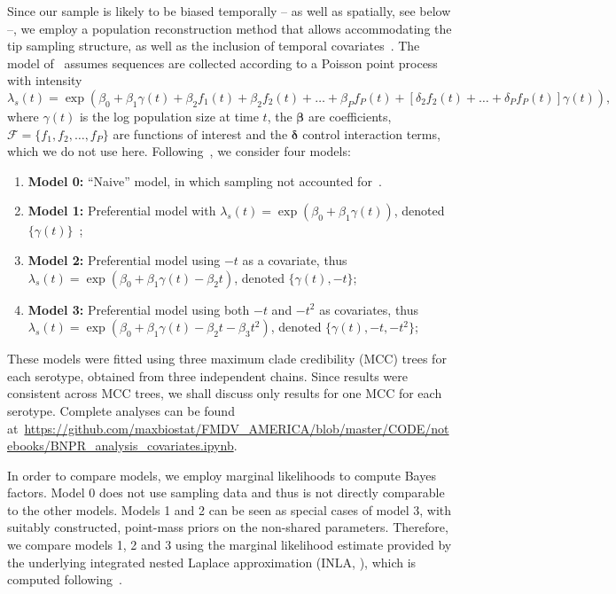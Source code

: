 \documentclass[a4paper,10pt]{article}
\begin{document}
Since our sample is likely to be biased temporally -- as well as spatially, see below --, we employ a population reconstruction method that allows accommodating the tip sampling structure, as well as the inclusion of temporal covariates~\citep{M-Karcher2019}.
The model of~\cite{M-Karcher2019} assumes sequences are collected according to a Poisson point process with intensity
\begin{equation}
 \label{eq:skytrack}
 \lambda_s(t) = \exp\left( \beta_0 + \beta_1\gamma(t) + \beta_2 f_1(t)  + \beta_2 f_2(t) + \ldots + \beta_P f_P(t) + \left[\delta_2 f_2(t) + \ldots + \delta_P f_P(t) \right]\gamma(t) \right),
\end{equation}
where $\gamma(t)$ is the log population size at time $t$, the $\boldsymbol\beta$ are coefficients, $\mathcal{F} = \{f_1, f_2, \ldots, f_P\}$ are functions of interest and the $\boldsymbol\delta$ control interaction terms, which we do not use here.
Following~\cite{M-Karcher2019}, we consider four models:
\begin{enumerate}
 \item \textbf{Model 0:} ``Naive'' model, in which sampling not accounted for~\citep{Palacios2015}.
 \item \textbf{Model 1:} Preferential model with $\lambda_s(t) = \exp(\beta_0 + \beta_1\gamma(t))$, denoted $\{\gamma(t)\}$~\citep{M-Karcher2016};
 \item \textbf{Model 2:} Preferential model using $-t$ as a covariate, thus $\lambda_s(t) = \exp(\beta_0 + \beta_1\gamma(t) -\beta_2 t)$, denoted $\{\gamma(t), -t\}$;
 \item \textbf{Model 3:} Preferential model using both $-t$ and $-t^2$ as covariates, thus $\lambda_s(t) = \exp(\beta_0 + \beta_1\gamma(t) -\beta_2 t - \beta_3t^2)$, denoted $\{\gamma(t), -t, -t^2\}$;
\end{enumerate}

These models were fitted using three maximum clade credibility (MCC) trees for each serotype, obtained from three independent chains.
Since results were consistent across MCC trees, we shall discuss only results for one MCC for each serotype.
Complete analyses can be found at~\url{https://github.com/maxbiostat/FMDV_AMERICA/blob/master/CODE/notebooks/BNPR_analysis_covariates.ipynb}.

In order to compare models, we employ marginal likelihoods to compute Bayes factors.
Model 0 does not use sampling data and thus is not directly comparable to the other models.
Models 1 and 2 can be seen as special cases of model 3, with suitably constructed, point-mass priors on the non-shared parameters.
Therefore, we compare models 1, 2 and 3 using the marginal likelihood estimate provided by the underlying integrated nested Laplace approximation (INLA, \cite{Martins2013}), which is computed following~\cite{Hubin2016}.
\end{document}

